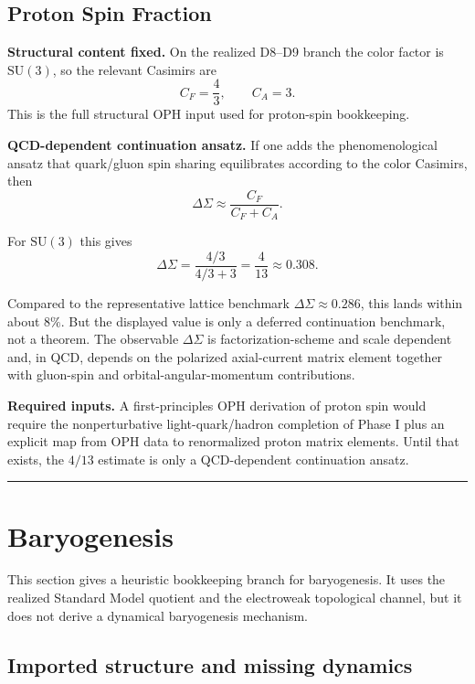 \subsection{Proton Spin Fraction}\label{103-proton-spin-fraction}

\textbf{Structural content fixed.} On the realized D8--D9 branch the color factor is \(\mathrm{SU}(3)\), so the relevant Casimirs are
\[
C_F=\frac43,\qquad C_A=3.
\]
This is the full structural OPH input used for proton-spin bookkeeping.

\textbf{QCD-dependent continuation ansatz.} If one adds the phenomenological ansatz that quark/gluon spin sharing equilibrates according to the color Casimirs, then
\[
\Delta\Sigma \approx \frac{C_F}{C_F + C_A}.
\]

For \(\mathrm{SU}(3)\) this gives
\[
\Delta\Sigma = \frac{4/3}{4/3 + 3} = \frac{4}{13} \approx 0.308.
\]

Compared to the representative lattice benchmark \(\Delta\Sigma \approx 0.286\), this lands within about \(8\%\). But the displayed value is only a deferred continuation benchmark, not a theorem. The observable \(\Delta\Sigma\) is factorization-scheme and scale dependent and, in QCD, depends on the polarized axial-current matrix element together with gluon-spin and orbital-angular-momentum contributions.

\textbf{Required inputs.} A first-principles OPH derivation of proton spin would require the nonperturbative light-quark/hadron completion of Phase I plus an explicit map from OPH data to renormalized proton matrix elements. Until that exists, the \(4/13\) estimate is only a QCD-dependent continuation ansatz.

\begin{center}\rule{0.5\linewidth}{0.5pt}\end{center}

\section{Baryogenesis}\label{11-baryogenesis}

This section gives a heuristic bookkeeping branch for baryogenesis. It uses the realized Standard Model quotient and the electroweak topological channel, but it does not derive a dynamical baryogenesis mechanism.

\subsection{Imported structure and missing dynamics}

